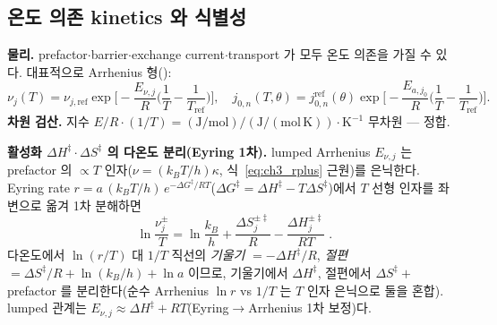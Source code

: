 \subsection{온도 의존 kinetics 와 식별성}\label{sec:ch3_ident}
\textbf{물리.} prefactor$\cdot$barrier$\cdot$exchange current$\cdot$transport 가 모두 온도 의존을 가질 수 있다.
대표적으로 Arrhenius 형():
\begin{equation}
\nu_j(T)=\nu_{j,\mathrm{ref}}\exp\!\Big[-\frac{E_{\nu,j}}{R}\Big(\frac1T-\frac1{T_{\mathrm{ref}}}\Big)\Big],\quad
j_{0,n}(T,\theta)=j_{0,n}^{\mathrm{ref}}(\theta)\exp\!\Big[-\frac{E_{a,j_0}}{R}\Big(\frac1T-\frac1{T_{\mathrm{ref}}}\Big)\Big].
\label{eq:ch3_T}
\end{equation}
\textbf{차원 검산.} 지수 $E/R\cdot(1/T)=\mathrm{(J/mol)}/\mathrm{(J/(mol\,K))}\cdot\mathrm{K^{-1}}$ 무차원 — 정합.

\textbf{활성화 $\Delta H^\ddagger\cdot\Delta S^\ddagger$ 의 다온도 분리(Eyring 1차).} lumped Arrhenius $E_{\nu,j}$ 는
prefactor 의 $\propto T$ 인자($\nu=(k_BT/h)\kappa$, 식~\eqref{eq:ch3_rplus} 근원)를 은닉한다. Eyring rate
$r=a\,(k_BT/h)\,e^{-\Delta G^\ddagger/RT}$($\Delta G^\ddagger=\Delta H^\ddagger-T\Delta S^\ddagger$)에서 $T$
선형 인자를 좌변으로 옮겨 1차 분해하면
\begin{equation}
\boxed{\;\ln\frac{\nu_j^\pm}{T}=\ln\frac{k_B}{h}+\frac{\Delta S_j^{\pm\ddagger}}{R}-\frac{\Delta H_j^{\pm\ddagger}}{RT}\;.}
\label{eq:ch3_eyring}
\end{equation}
다온도에서 $\ln(r/T)$ 대 $1/T$ 직선의 \emph{기울기} $=-\Delta H^\ddagger/R$, \emph{절편}
$=\Delta S^\ddagger/R+\ln(k_B/h)+\ln a$ 이므로, 기울기에서 $\Delta H^\ddagger$, 절편에서
$\Delta S^\ddagger+$prefactor 를 분리한다(순수 Arrhenius $\ln r$ vs $1/T$ 는 $T$ 인자 은닉으로 둘을 혼합).
lumped 관계는 $E_{\nu,j}\approx\Delta H^\ddagger+RT$(Eyring$\to$Arrhenius 1차 보정)다.

